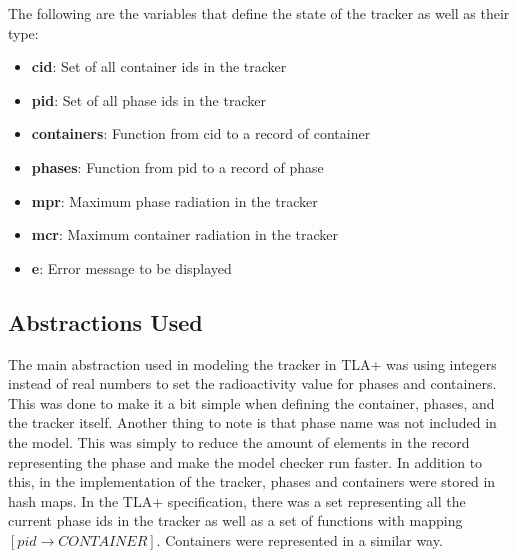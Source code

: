 \newpage

The following are the variables that define the state of the tracker as well as their type:

\begin{itemize}
\item \textbf{cid}: Set of all container ids in the tracker
\item \textbf{pid}: Set of all phase ids in the tracker
\item \textbf{containers}: Function from cid to a record of container
\item \textbf{phases}: Function from pid to a record of phase
\item \textbf{mpr}: Maximum phase radiation in the tracker
\item \textbf{mcr}: Maximum container radiation in the tracker
\item \textbf{e}: Error message to be displayed
\end{itemize}

\tlatex
\@x{ {\VARIABLES}}%
%
%
%
%
%
%
%

%
%
%
%
%
\@x{\@s{16.4} \.{\land}\@s{9.74} containers \.{\in} [cid -> CONTAINER}%
%
%



\newpage


\subsection{Abstractions Used}

The main abstraction used in modeling the tracker in TLA+ was using integers instead of real numbers to set the radioactivity value for phases and containers. This was done to make it a bit simple when defining the container, phases, and the tracker itself. Another thing to note is that phase name was not included in the model. This was simply to reduce the amount of elements in the record representing the phase and make the model checker run faster. In addition to this, in the implementation of the tracker, phases and containers were stored in hash maps. In the TLA+ specification, there was a set representing all the current phase ids in the tracker as well as a set of functions with mapping $[pid \to CONTAINER]$. Containers were represented in a similar way. 

